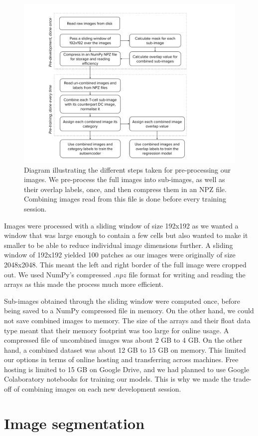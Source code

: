 \begin{figure}[h]
    \centering
    \includegraphics[width=.6\textwidth]{dissertation/figures/preprocessing_steps.pdf}
    \caption{Diagram illustrating the different steps taken for pre-processing our images. We pre-process the full images into sub-images, as well as their overlap labels, once, and then compress them in an NPZ file. Combining images read from this file is done before every training session.}
    \label{fig:preprocessing}
\end{figure}

Images were processed with a sliding window of size 192x192 as we wanted a window that was large enough to contain a few cells but also wanted to make it smaller to be able to reduce individual image dimensions further. A sliding window of 192x192 yielded 100 patches as our images were originally of size 2048x2048. This meant the left and right border of the full image were cropped out. We used NumPy's compressed $.npz$ file format for writing and reading the arrays as this made the process much more efficient.

Sub-images obtained through the sliding window were computed once, before being saved to a NumPy compressed file in memory. On the other hand, we could not save combined images to memory. The size of the arrays and their float data type meant that their memory footprint was too large for online usage. A compressed file of uncombined images was about 2 GB to 4 GB. On the other hand, a combined dataset was about 12 GB to 15 GB on memory. This limited our options in terms of online hosting and transferring across machines. Free hosting is limited to 15 GB on Google Drive, and we had planned to use Google Colaboratory notebooks for training our models. This is why we made the trade-off of combining images on each new development session.

\section{Image segmentation}

